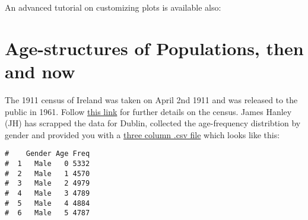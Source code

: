 \documentclass[letterpaper,9pt,twoside,printwatermark=false]{pinp}
\begin{document}
\begin{Shaded}
\begin{Highlighting}[]
\OperatorTok{::}\NormalTok{(}\NormalTok{, } \NormalTok{)}
\end{Highlighting}
\end{Shaded}

An advanced tutorial on customizing plots is available also:

\begin{Shaded}
\begin{Highlighting}[]
\OperatorTok{::}\NormalTok{(}\NormalTok{, } \NormalTok{)}
\end{Highlighting}
\end{Shaded}

\section{Age-structures of Populations, then and
now}\label{age-structures-of-populations-then-and-now}

The 1911 census of Ireland was taken on April 2nd 1911 and was released
to the public in 1961. Follow
\href{http://www.census.nationalarchives.ie/help/about19011911census.html}{this
link} for further details on the census. James Hanley (JH) has scrapped
the data for Dublin, collected the age-frequency distribtion by gender
and provided you with a
\href{https://github.com/sahirbhatnagar/EPIB607/raw/master/data/age_sex_frequencies_ireland.csv}{three
column .csv file} which looks like this:

\begin{Shaded}
\begin{Highlighting}[]
\StringTok{ }\NormalTok{(}\NormalTok{)}
\end{Highlighting}
\end{Shaded}

\begin{ShadedResult}
\begin{verbatim}
#    Gender Age Freq
#  1   Male   0 5332
#  2   Male   1 4570
#  3   Male   2 4979
#  4   Male   3 4789
#  5   Male   4 4884
#  6   Male   5 4787
\end{verbatim}
\end{ShadedResult}
\end{document}
